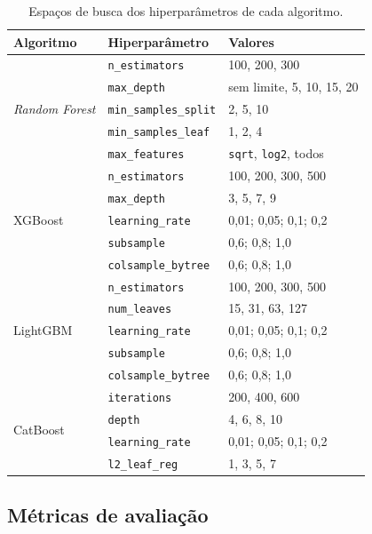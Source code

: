 \begin{table}[htbp]
	\centering
	\caption{Espaços de busca dos hiperparâmetros de cada algoritmo.}
	\label{tab:espacos-busca}
	\begin{tabular}{llp{6.5cm}}
		\toprule
		\textbf{Algoritmo} & \textbf{Hiperparâmetro} & \textbf{Valores} \\
		\midrule
		\multirow{5}{*}{\textit{Random Forest}}
		& \texttt{n\_estimators}      & 100, 200, 300 \\
		& \texttt{max\_depth}         & sem limite, 5, 10, 15, 20 \\
		& \texttt{min\_samples\_split} & 2, 5, 10 \\
		& \texttt{min\_samples\_leaf}  & 1, 2, 4 \\
		& \texttt{max\_features}      & \texttt{sqrt}, \texttt{log2}, todos \\
		\midrule
		\multirow{5}{*}{XGBoost}
		& \texttt{n\_estimators}      & 100, 200, 300, 500 \\
		& \texttt{max\_depth}         & 3, 5, 7, 9 \\
		& \texttt{learning\_rate}     & 0,01; 0,05; 0,1; 0,2 \\
		& \texttt{subsample}          & 0,6; 0,8; 1,0 \\
		& \texttt{colsample\_bytree}  & 0,6; 0,8; 1,0 \\
		\midrule
		\multirow{5}{*}{LightGBM}
		& \texttt{n\_estimators}      & 100, 200, 300, 500 \\
		& \texttt{num\_leaves}        & 15, 31, 63, 127 \\
		& \texttt{learning\_rate}     & 0,01; 0,05; 0,1; 0,2 \\
		& \texttt{subsample}          & 0,6; 0,8; 1,0 \\
		& \texttt{colsample\_bytree}  & 0,6; 0,8; 1,0 \\
		\midrule
		\multirow{4}{*}{CatBoost}
		& \texttt{iterations}         & 200, 400, 600 \\
		& \texttt{depth}              & 4, 6, 8, 10 \\
		& \texttt{learning\_rate}     & 0,01; 0,05; 0,1; 0,2 \\
		& \texttt{l2\_leaf\_reg}      & 1, 3, 5, 7 \\
		\bottomrule
	\end{tabular}
\end{table}

\subsection{Métricas de avaliação}

